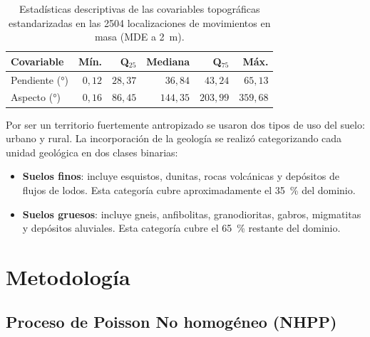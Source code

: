 \documentclass[12pt, a4paper]{article}
\begin{document}
\begin{table}[H]
  \centering
  \caption{Estadísticas descriptivas de las covariables topográficas estandarizadas
           en las \num{2504} localizaciones de movimientos en masa (MDE a \SI{2}{m}).}
  \label{tab:covstats}
  \begin{tabular}{lrrrrr}
    \toprule
    Covariable & Mín. & Q$_{25}$ & Mediana & Q$_{75}$ & Máx. \\
    \midrule
    Pendiente (°)        & $0{,}12$  & $28{,}37$ & $36{,}84$ & $43{,}24$ & $65{,}13$ \\
    Aspecto (°)          & $0{,}16$  & $86{,}45$ & $144{,}35$ & $203{,}99$ & $359{,}68$ \\
    \bottomrule
  \end{tabular}
  \begin{minipage}{\linewidth}
  \end{minipage}
\end{table}

Por ser un territorio fuertemente antropizado se usaron dos tipos de uso del suelo: urbano y rural. La incorporación de la geología se realizó categorizando cada unidad geológica en
dos clases binarias:

\begin{itemize}
  \item \textbf{Suelos finos}: incluye esquistos, dunitas,
  rocas volcánicas y depósitos de flujos de lodos. Esta categoría cubre
  aproximadamente el \SI{35}{\percent} del dominio.

  \item \textbf{Suelos gruesos}: incluye gneis,
  anfibolitas, granodioritas, gabros, migmatitas y depósitos aluviales. Esta
  categoría cubre el \SI{65}{\percent} restante del dominio.
\end{itemize}

\section{Metodología}
\label{sec:methods}

\subsection{Proceso de Poisson No homogéneo (NHPP)}
\label{sec:ipp}
\end{document}
